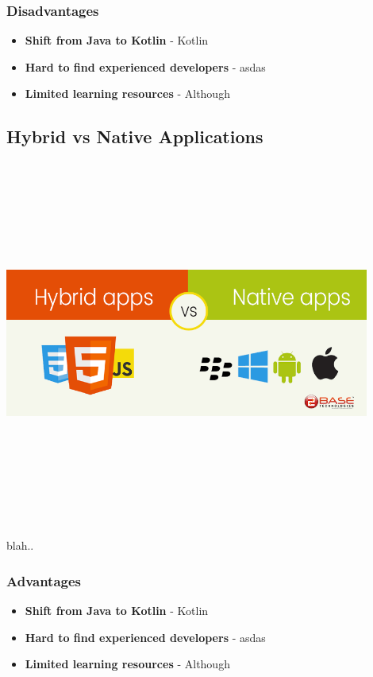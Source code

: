 \subsubsection{Disadvantages}
\begin{itemize}
    \item \textbf{Shift from Java to Kotlin} - Kotlin
    \item \textbf{Hard to find experienced developers} - asdas
    \item \textbf{Limited learning resources} - Although
\end{itemize}

\subsection{Hybrid vs Native Applications}
\par
\medskip
\begin{center}
    \includegraphics[width=12cm,height=12cm,keepaspectratio]{Images/hybridvnative.png}
\end{center}

blah..


\subsubsection{Advantages}
\begin{itemize}
    \item \textbf{Shift from Java to Kotlin} - Kotlin
    \item \textbf{Hard to find experienced developers} - asdas
    \item \textbf{Limited learning resources} - Although
\end{itemize}
